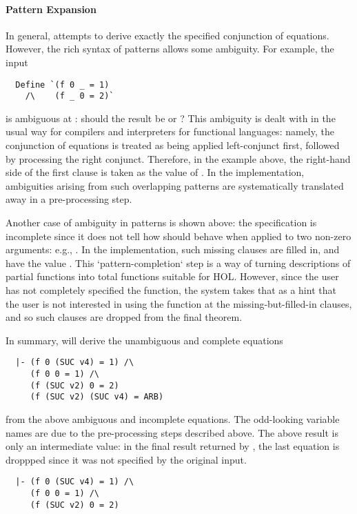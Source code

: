 \paragraph{Pattern Expansion}
In general,  attempts to derive exactly the specified
conjunction of equations. However, the rich syntax of patterns allows
some ambiguity. For example, the input
%
\begin{hol}
\begin{verbatim} 
  Define `(f 0 _ = 1)
    /\    (f _ 0 = 2)`
\end{verbatim} 
\end{hol}
%
is ambiguous at : should the result be  or
?  This ambiguity is dealt with in the usual way for compilers and
interpreters for functional languages: namely, the conjunction of
equations is treated as being applied left-conjunct first, followed
by processing the right conjunct. Therefore, in the example above, the
right-hand side of the first clause is taken as the value of 
. In the implementation, ambiguities arising 
from such overlapping patterns are systematically translated 
away in a pre-processing step.
 
 Another case of ambiguity in patterns is shown above: the specification
is incomplete since it does not tell how  should behave when
applied to two non-zero arguments: e.g., . In the
implementation, such missing clauses are filled in, and have the value
. This `pattern-completion` step is a way of turning descriptions
of partial functions into total functions suitable for HOL. However,
since the user has not completely specified the function, the system
takes that as a hint that the user is not interested in using the
function at the missing-but-filled-in clauses, and so such clauses are
dropped from the final theorem.
 
In summary,  will derive the unambiguous and complete
equations
%
\begin{hol}
\begin{verbatim} 
  |- (f 0 (SUC v4) = 1) /\
     (f 0 0 = 1) /\
     (f (SUC v2) 0 = 2)
     (f (SUC v2) (SUC v4) = ARB)
\end{verbatim} 
\end{hol}
%
from the above ambiguous and incomplete equations. The odd-looking
variable names are due to the pre-processing steps described above. The
above result is only an intermediate value: in the final result returned
by \ml{Define}, the last equation is droppped since it was not 
specified by the original input.
\begin{hol}
\begin{verbatim} 
  |- (f 0 (SUC v4) = 1) /\
     (f 0 0 = 1) /\
     (f (SUC v2) 0 = 2)
\end{verbatim} 
\end{hol}
  
